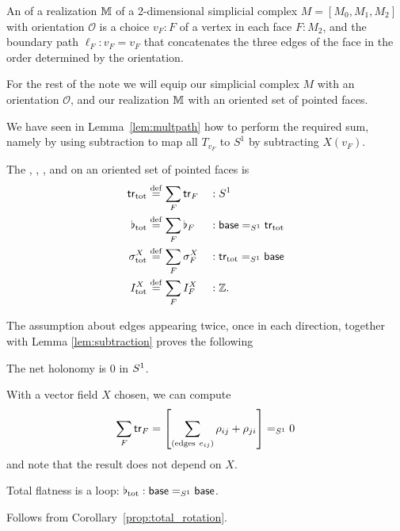 \begin{mydef}
An  of a realization \( \mathbb{M} \) of a 2-dimensional simplicial complex \( M=[M_0,M_1,M_2] \) with orientation \( \mathscr{O} \) is a choice \( v_F:F \) of a vertex in each face \( F:M_2 \), and the boundary path \( \ell_F:v_F=v_F \) that concatenates the three edges of the face in the order determined by the orientation.
\end{mydef}

For the rest of the note we will equip our simplicial complex \( M \) with an orientation \( \mathscr{O} \), and our realization \( \mathbb{M} \) with an oriented set of pointed faces.

We have seen in Lemma~\ref{lem:multpath} how to perform the required sum, namely by using subtraction to map all \( T_{v_F} \) to \( S^1 \) by subtracting \( X(v_F) \).
\begin{mydef}
The , , , and  on an oriented set of pointed faces is
\begin{equation}
\label{eq:tot_elements}
\begin{aligned}
\mathsf{tr}_{\mathrm{tot}}      & \stackrel{\mathrm{def}}{=} \sum_F\mathsf{tr}_F &&:S^1\\
\flat_{\mathrm{tot}}    & \stackrel{\mathrm{def}}{=} \sum_F\flat_F &&:\mathsf{base}=_{S^1}\mathsf{tr}_{\mathrm{tot}}\\
\sigma^X_{\mathrm{tot}} & \stackrel{\mathrm{def}}{=} \sum_F\sigma^X_F &&:\mathsf{tr}_{\mathrm{tot}}=_{S^1}\mathsf{base}\\
I^X_{\mathrm{tot}}      & \stackrel{\mathrm{def}}{=} \sum_F I^X_F &&:\mathbb{Z}.
\end{aligned}
\end{equation}
\end{mydef}

The assumption about edges appearing twice, once in each direction, together with Lemma \ref{lem:subtraction} proves the following
\begin{myprop}The net holonomy is \( 0 \) in \( S^1 \).\label{prop:total_rotation}
\end{myprop}
\begin{myproof}
With a vector field \( X \) chosen, we can compute \[ \sum_F\mathsf{tr}_F=\left[\sum_{(\mathrm{edges\ }e_{ij})} \rho_{ij}+\rho_{ji}\right]=_{S^1}0 \] and note that the result does not depend on \( X \).
\end{myproof}

\begin{mycor}
Total flatness is a loop: \( \flat_{\mathrm{tot}}:\mathsf{base}=_{S^1}\mathsf{base} \).
\end{mycor}\begin{myproof}Follows from Corollary~\ref{prop:total_rotation}.\end{myproof}


